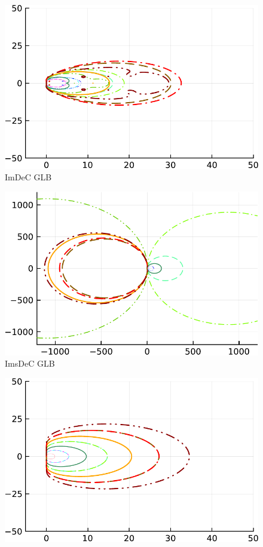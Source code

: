 \begin{figure}
\begin{minipage}[t]{0.32\textwidth}
		\includegraphics[width=\textwidth, trim={0 0 0 0}, clip]{pdf/odepics/IMDeC_GLB_ord13-crop.pdf}\\
		ImDeC GLB
	\end{minipage}
	\begin{minipage}[t]{0.32\textwidth}
		\centering
	\includegraphics[width=\textwidth, trim={0 0 0 0}, clip]{pdf/odepics/IMsDeC_GLB_ord13-crop.pdf}\\
	ImsDeC GLB
	\end{minipage}
	\begin{minipage}[t]{0.32\textwidth}
		\centering
		\includegraphics[width=\textwidth, trim={0 0 0 0}, clip]{pdf/odepics/IMADER_GLB_ord13-crop.pdf}\\

\end{minipage}
\end{figure}
